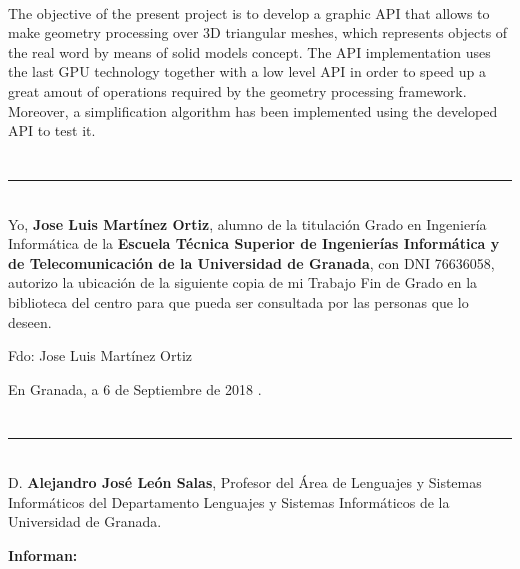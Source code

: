 \vspace{0.7cm}
\\
The objective of the present project is to develop a graphic API that allows to make geometry processing
over 3D triangular meshes, which represents objects of the real word by means of solid models concept.
The API implementation uses the last GPU technology together with a low level API in order to speed up
a great amout of operations required by the geometry processing framework. Moreover, a simplification
algorithm has been implemented using the developed API to test it.

\chapter*{}
\thispagestyle{empty}

\noindent\rule[-1ex]{\textwidth}{2pt}\\[4.5ex]

Yo, \textbf{Jose Luis Martínez Ortiz}, alumno de la titulación Grado en Ingeniería Informática de la \textbf{Escuela Técnica Superior
de Ingenierías Informática y de Telecomunicación de la Universidad de Granada}, con DNI 76636058, autorizo la
ubicación de la siguiente copia de mi Trabajo Fin de Grado en la biblioteca del centro para que pueda ser
consultada por las personas que lo deseen.

\vspace{6cm}

\noindent Fdo: Jose Luis Martínez Ortiz

\vspace{2cm}

\begin{flushright}
En Granada, a 6 de Septiembre de 2018 .
\end{flushright}


\chapter*{}
\thispagestyle{empty}

\noindent\rule[-1ex]{\textwidth}{2pt}\\[4.5ex]

D. \textbf{Alejandro José León Salas}, Profesor del Área de Lenguajes y Sistemas Informáticos del Departamento Lenguajes y Sistemas Informáticos de la Universidad de Granada.

\vspace{0.5cm}

\textbf{Informan:}

